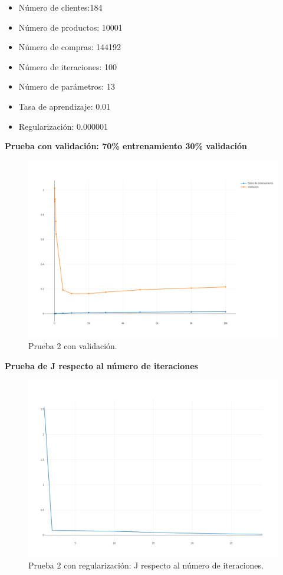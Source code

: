 {{{{{\begin{itemize}
\item Número de clientes:184
\item Número de productos: 10001
\item Número de compras: 144192
\item Número de iteraciones: 100
\item Número de parámetros: 13
\item Tasa de aprendizaje: 0.01
\item Regularización: 0.000001
\end{itemize}
\newpage
\textbf{Prueba con validación: 70\% entrenamiento 30\% validación}
\FloatBarrier
\begin{figure}[htbp!]
		\centering
			\includegraphics[width=1 \textwidth]{imagenes/pruebassistemarecom/100_000001_13}
		\caption{Prueba 2 con validación.}
		\label{gradiente_desc}
\end{figure}
\FloatBarrier
\newpage
\textbf{Prueba de J respecto al número de iteraciones}

\FloatBarrier
\begin{figure}[htbp!]
		\centering
			\includegraphics[width=1 \textwidth]{imagenes/pruebassistemarecom/1_j}
		\caption{Prueba 2 con regularización: J respecto al número de iteraciones.}
		\label{gradiente_desc}
\end{figure}
\FloatBarrier

}}}}}

